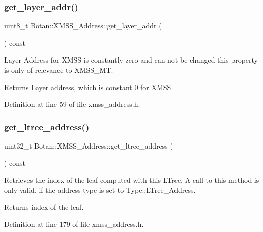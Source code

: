 \subsubsection{\texorpdfstring{get\+\_\+layer\+\_\+addr()}{get\_layer\_addr()}}
{\footnotesize\ttfamily uint8\+\_\+t Botan\+::\+X\+M\+S\+S\+\_\+\+Address\+::get\+\_\+layer\+\_\+addr (\begin{DoxyParamCaption}{ }\end{DoxyParamCaption}) const\hspace{0.3cm}{\ttfamily [inline]}}

Layer Address for X\+M\+SS is constantly zero and can not be changed this property is only of relevance to X\+M\+S\+S\+\_\+\+MT.

\begin{DoxyReturn}{Returns}
Layer address, which is constant 0 for X\+M\+SS. 
\end{DoxyReturn}


Definition at line 59 of file xmss\+\_\+address.\+h.

\mbox{\label{class_botan_1_1_x_m_s_s___address_a67c3f3349ae7545bccf57f6e37f81849}} 
\subsubsection{\texorpdfstring{get\+\_\+ltree\+\_\+address()}{get\_ltree\_address()}}
{\footnotesize\ttfamily uint32\+\_\+t Botan\+::\+X\+M\+S\+S\+\_\+\+Address\+::get\+\_\+ltree\+\_\+address (\begin{DoxyParamCaption}{ }\end{DoxyParamCaption}) const\hspace{0.3cm}{\ttfamily [inline]}}

Retrieves the index of the leaf computed with this L\+Tree. A call to this method is only valid, if the address type is set to Type\+::\+L\+Tree\+\_\+\+Address.

\begin{DoxyReturn}{Returns}
index of the leaf. 
\end{DoxyReturn}


Definition at line 179 of file xmss\+\_\+address.\+h.

